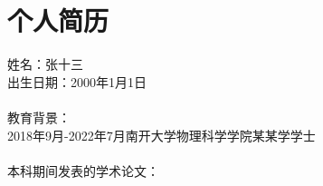 

\chapter*{个人简历}

\noindent 姓名：张十三\\
出生日期：2000年1月1日\\
\\
教育背景：\\
2018年9月-2022年7月\quad 南开大学\quad 物理科学学院\quad\quad\quad\quad 某某学\quad\quad 学士 \\
\\
本科期间发表的学术论文：\\

